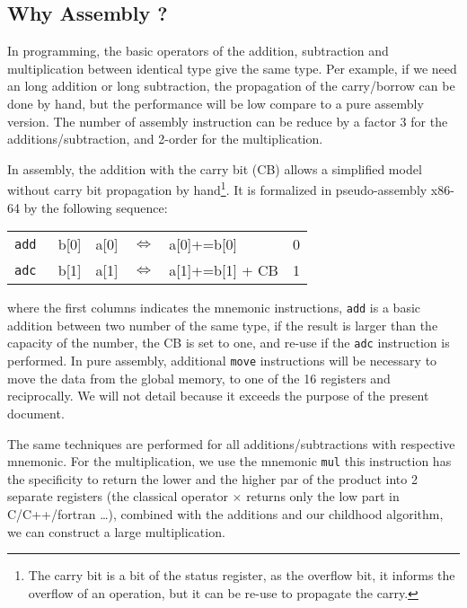 \documentclass[11pt]{amsart}
\begin{document}
\subsection*{Why Assembly ?}

In programming, the basic operators of the addition, subtraction and multiplication between identical type give the same type. 
Per example, if we need an long addition or long subtraction, the propagation of the  carry/borrow can be done by hand, but the performance will be low compare to a pure assembly version. 
The number of assembly instruction can be reduce by a factor 3 for the additions/subtraction, and  2-order for the multiplication.

In assembly, the addition with the carry bit (CB) allows a simplified model without  carry bit propagation by hand\footnote{ The carry bit is a bit of the status register, as the overflow bit, 
it informs  the overflow of an operation, but it can be re-use to propagate the carry. }.  It is formalized in pseudo-assembly x86-64 by the following sequence:
\begin{table}[htdp]
\begin{center}
\begin{tabular}{ l c c c l c}
 \texttt{add }   &  b[0]  & a[0]    & $\Leftrightarrow$ & a[0]+=b[0]            & \tiny{0}  \\ 
 \texttt{adc }   &  b[1]   & a[1]   & $\Leftrightarrow$ & a[1]+=b[1] + CB  & \tiny{1}  \\  
\end{tabular}
\end{center}
\end{table}%
where the first columns indicates the  mnemonic instructions, \texttt{add} is a basic addition between two number of the same type, if the result is larger than the capacity of the number, the CB is set to one,
and re-use if the \texttt{adc} instruction is performed. In pure assembly, additional \texttt{move} instructions will be necessary to move the data from the global memory, to one of the 16 registers and reciprocally.
We will not detail because it exceeds the purpose of the present document. 

The same techniques are performed for all additions/subtractions with respective mnemonic. For the multiplication, we use the mnemonic \texttt{mul} this instruction has the specificity to return the lower and the higher
par of the product into 2 separate registers (the classical operator $\times$ returns only the low part in C/C++/fortran \dots), combined with the additions and our childhood algorithm, we can construct a large multiplication.  
\end{document}
